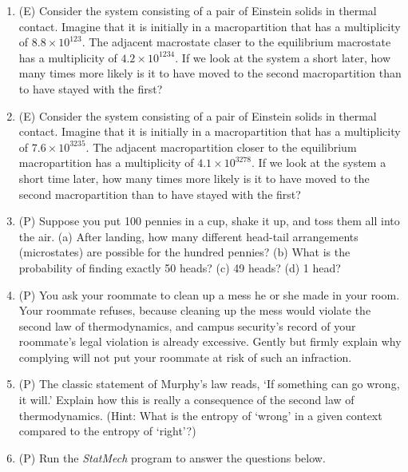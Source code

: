 \begin{enumerate}
\item (E) Consider the system consisting of a pair of Einstein solids in thermal contact.  
Imagine that it is initially in a macropartition that has a multiplicity of $8.8 \times 10^{123}$.  
The adjacent macrostate claser to the equilibrium macrostate has a multiplicity
of $4.2 \times 10^{1234}$.  If we look at the system a 
short later, how many times more likely is it to have moved to the second macropartition 
than to have stayed with the first?

\item (E) Consider the system consisting of a pair of Einstein solids in thermal contact.  
Imagine that it is initially in a macropartition that has a multiplicity of $7.6 \times 10^{3235}$.  
The adjacent macropartition closer to the equilibrium macropartition has a multiplicity 
of $4.1 \times 10^{3278}$.  If we look at the system a short time later, how many times more likely 
is it to have moved to the second macropartition than to have stayed with the first?

\item(P) Suppose you put 100 pennies in a cup, shake it up, and toss them all into the
air.
(a) After landing, how many different head-tail arrangements (microstates) are possible for
the hundred pennies?
(b) What is the probability of finding exactly 50 heads? 
(c) 49 heads?
(d) 1 head?

\item(P) You ask your roommate to clean up a mess he or she made in your room.  Your roommate 
refuses, because cleaning up the mess would violate the second law of thermodynamics, and 
campus security's record of your roommate's legal violation is already excessive.  
Gently but firmly explain why complying will not put your roommate at risk of such an infraction.

\item(P) The classic statement of Murphy's law reads, `If something can go wrong, it will.'   
Explain how this is really a consequence of the second law of thermodynamics.  (Hint:  
What is the entropy of `wrong' in a given context compared to the entropy of `right'?)

\item(P) Run the {\it StatMech} program to answer the questions below.

\begin{enumerate}


\end{enumerate}
\end{enumerate}
